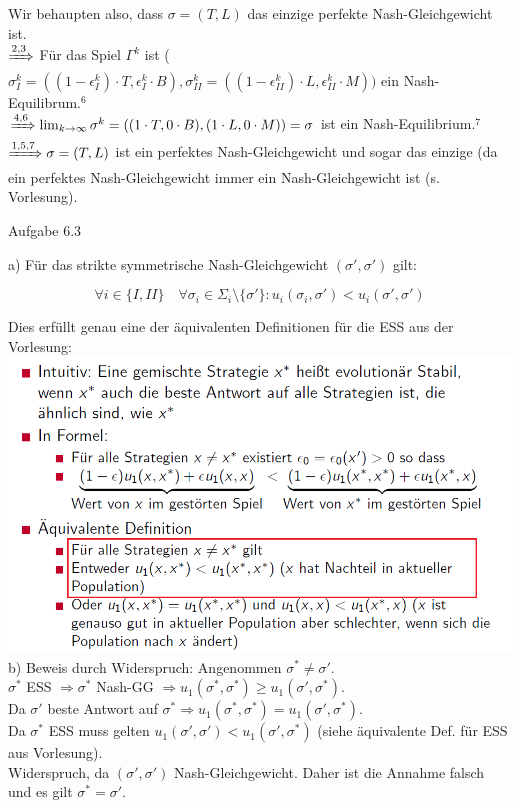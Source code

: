 \documentclass{scrartcl}
\begin{document}
Wir behaupten also, dass $\sigma = (T, L)$ das einzige perfekte Nash-Gleichgewicht ist. \\

$\xRightarrow{2,3}$ Für das Spiel $\Gamma^k$ ist ($\sigma^k_I = ((1 - \epsilon^k_I) \cdot T, \epsilon^k_I 
\cdot B), \sigma^k_{II} = ((1 - \epsilon^k_{II}) \cdot L, \epsilon^k_{II} \cdot M))$ ein 
Nash-Equilibrum.$^6$
\\

$\xRightarrow{4,6} \lim_{k \to \infty} \sigma^k = ((1 \cdot T, 0 \cdot B), (1 \cdot L, 0 \cdot M)) =
\sigma$ ist ein Nash-Equilibrium.$^7$ \\

$\xRightarrow{1,5,7} \sigma = (T, L)$ ist ein perfektes Nash-Gleichgewicht und sogar das einzige (da ein
perfektes Nash-Gleichgewicht immer ein Nash-Gleichgewicht ist (s. Vorlesung). \clearpage

\begin{Large}
Aufgabe 6.3\\[0.0cm]
\end{Large}

a) Für das strikte symmetrische Nash-Gleichgewicht $(\sigma', \sigma')$ gilt: 

\[
\forall i \in \{I, II\} \quad \forall \sigma_i \in \Sigma_i \setminus \{\sigma'\} : u_i(\sigma_i, 
\sigma') < u_i(\sigma', \sigma') 
\]

Dies erfüllt genau eine der äquivalenten Definitionen für die ESS aus der Vorlesung: \\

\includegraphics[width=14.5cm]{ess_def.png} \\

b) Beweis durch Widerspruch: Angenommen $\sigma^* \neq \sigma'$. \\

$\sigma^*$ ESS $\Rightarrow \sigma^*$ Nash-GG $\Rightarrow u_1(\sigma^*, \sigma^*) \geq u_1(\sigma',
\sigma^*)$. \\

Da $\sigma'$ beste Antwort auf $\sigma^* \Rightarrow u_1(\sigma^*, \sigma^*) = u_1(\sigma',
\sigma^*)$. \\

Da $\sigma^*$ ESS muss gelten $u_1(\sigma',\sigma') < u_1(\sigma', \sigma^*)$ (siehe äquivalente Def.
für ESS aus Vorlesung). \\

Widerspruch, da $(\sigma',\sigma')$ Nash-Gleichgewicht. Daher ist die Annahme falsch und es gilt
$\sigma^* = \sigma'$. \\
\end{document}
